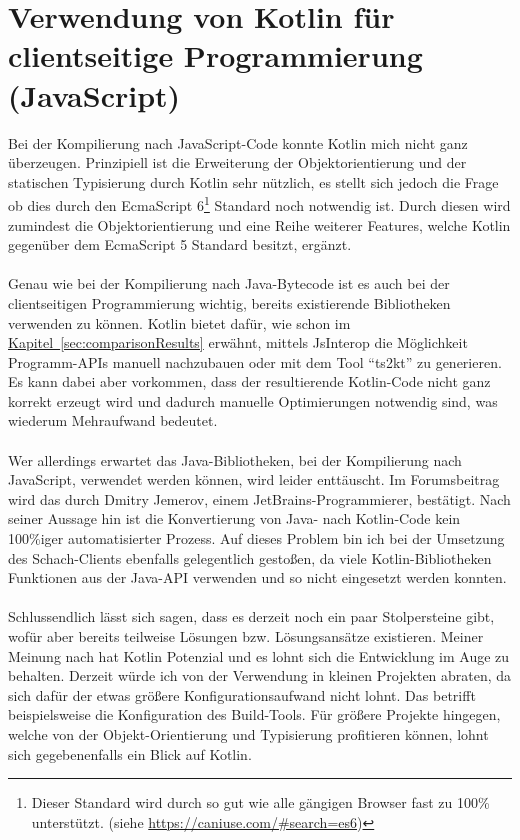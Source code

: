 \section{Verwendung von Kotlin für clientseitige Programmierung (JavaScript)}\label{sec:conclusionKotlinJS}
Bei der Kompilierung nach JavaScript-Code konnte Kotlin mich nicht ganz überzeugen. Prinzipiell ist die Erweiterung der Objektorientierung und der statischen Typisierung durch Kotlin sehr nützlich, es stellt sich jedoch die Frage ob dies durch den EcmaScript 6\footnote{Dieser Standard wird durch so gut wie alle gängigen Browser fast zu 100\% unterstützt. (siehe \url{https://caniuse.com/\#search=es6})} Standard noch notwendig ist. Durch diesen wird zumindest die Objektorientierung und eine Reihe weiterer Features, welche Kotlin gegenüber dem EcmaScript 5 Standard besitzt, ergänzt.\\
\\
Genau wie bei der Kompilierung nach Java-Bytecode ist es auch bei der clientseitigen Programmierung wichtig, bereits existierende Bibliotheken verwenden zu können. Kotlin bietet dafür, wie schon im \hyperref[sec:comparisonResults]{Kapitel~\ref{sec:comparisonResults}} erwähnt, mittels \gls{JsInterop} die Möglichkeit Programm-\glspl{API} manuell nachzubauen oder mit dem Tool \enquote{ts2kt} zu generieren. Es kann dabei aber vorkommen, dass der resultierende Kotlin-Code nicht ganz korrekt erzeugt wird und dadurch manuelle Optimierungen notwendig sind, was wiederum Mehraufwand bedeutet.\\
\\
Wer allerdings erwartet das Java-Bibliotheken, bei der Kompilierung nach JavaScript, verwendet werden können, wird leider enttäuscht. Im Forumsbeitrag \cite{kotlinJsUseJava} wird das durch Dmitry Jemerov, einem JetBrains-Programmierer, bestätigt. Nach seiner Aussage hin ist die Konvertierung von Java- nach Kotlin-Code kein 100\%iger automatisierter Prozess. Auf dieses Problem bin ich bei der Umsetzung des Schach-Clients ebenfalls gelegentlich gestoßen, da viele Kotlin-Bibliotheken Funktionen aus der Java-\gls{API} verwenden und so nicht eingesetzt werden konnten.\\
\\
Schlussendlich lässt sich sagen, dass es derzeit noch ein paar Stolpersteine gibt, wofür aber bereits teilweise Lösungen bzw. Lösungsansätze existieren. Meiner Meinung nach hat Kotlin Potenzial und es lohnt sich die Entwicklung im Auge zu behalten. Derzeit würde ich von der Verwendung in kleinen Projekten abraten, da sich dafür der etwas größere Konfigurationsaufwand nicht lohnt. Das betrifft beispielsweise die Konfiguration des Build-Tools. Für größere Projekte hingegen, welche von der Objekt-Orientierung und Typisierung profitieren können, lohnt sich gegebenenfalls ein Blick auf Kotlin.
